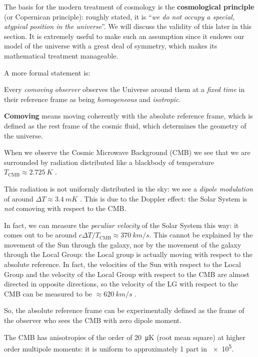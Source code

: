 \documentclass[main.tex]{subfiles}
\begin{document}
The basis for the modern treatment of cosmology is the \textbf{cosmological principle} (or Copernican principle):
roughly stated, it is ``\emph{we do not occupy a special, atypical position in the universe}''.
We will discuss the validity of this later in this section.
It is extremely useful to make such an assumption since it endows our model of the universe with a great deal of symmetry, which makes its mathematical treatment manageable. 

A more formal statement is:
%
\begin{proposition}
    Every \emph{comoving observer} observes the Universe around them at a \emph{fixed time} in their reference frame as being \emph{homogeneous} and \emph{isotropic}.
\end{proposition}

\textbf{Comoving} means moving coherently with the absolute reference frame, which is defined as the rest frame of the cosmic fluid, which determines the geometry of the universe. 

When we observe the Cosmic Microwave Background (CMB) we see that we are surrounded by radiation distributed like a blackbody of temperature \(T _{\text{CMB}} \approx \SI{2.725}{K}\) \cite[]{Fixsen:2009}.

This radiation is not uniformly distributed in the sky: we 
see a \emph{dipole modulation} of around \(\Delta T \approx\SI{3.4}{mK}\) \cite[]{PlanckCollaboration:2018I}.
This is due to the Doppler effect: the Solar System is \emph{not} comoving with respect to the CMB.

In fact, we can measure the \emph{peculiar velocity} of the Solar System this way: it comes out to be around \(c \Delta T / T _{\text{CMB}} \approx \SI{370}{km/s}\).
This cannot be explained by the movement of the Sun through the galaxy, nor by the movement of the galaxy through the Local Group: the Local group is actually moving with respect to the absolute reference.
In fact, the velocities of the Sun with respect to the Local Group and the velocity of the Local Group with respect to the CMB are almost directed in opposite directions, so the velocity of the LG with respect to the CMB can be measured to be \(\approx \SI{620}{km/s}\) \cite[Table 3]{PlanckCollaboration:2018I}.

So, the absolute reference frame can be experimentally defined as the frame of the observer who sees the CMB with zero dipole moment.

The CMB has anisotropies of the order of \SI{20}{\micro K} (root mean square) \cite[]{Wright:2003} at higher order multipole moments: it is uniform to approximately 1 part in \num{e5}.
\end{document}
